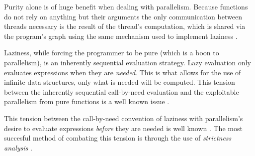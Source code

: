 
Purity alone is of huge benefit when dealing with parallelism. Because
functions do not rely on anything but their arguments the only communication
between threads necessary is the result of the thread's computation, which is
shared via the program's graph using the same mechanism used to implement
laziness \citep{SPJ:PIFPL}.

Laziness, while forcing the programmer to be pure (which is a boon to
parallelism), is an inherently sequential evaluation strategy. Lazy evaluation
only evaluates expressions when they are \emph{needed}. This is what allows for
the use of infinite data structures, only what is needed will be computed.
This tension between the inherently sequential call-by-need evaluation and the
exploitable parallelism from pure functions is a well known issue
\cite{tremblay1995impact}.

This tension between the call-by-need convention of laziness with parallelism's
desire to evaluate expressions \emph{before} they are needed is well known
\citep{tremblay1995impact}. The most succesful method of combating this tension
is through the use of \emph{strictness analysis} \citep{mycroft1980theory,
wadler1987projections, hinze1995projection}.
